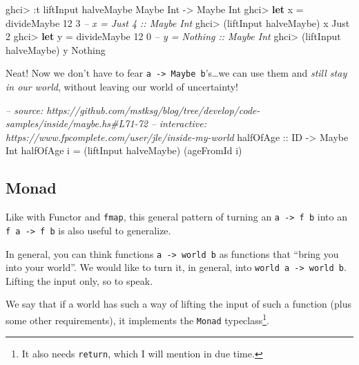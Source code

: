 \documentclass[]{article}
\newenvironment{Shaded}{}{}
\newcommand{\KeywordTok}[1]{\textcolor[rgb]{0.00,0.44,0.13}{\textbf{{#1}}}}
\newcommand{\DataTypeTok}[1]{\textcolor[rgb]{0.56,0.13,0.00}{{#1}}}
\newcommand{\DecValTok}[1]{\textcolor[rgb]{0.25,0.63,0.44}{{#1}}}
\newcommand{\CommentTok}[1]{\textcolor[rgb]{0.38,0.63,0.69}{\textit{{#1}}}}
\newcommand{\OtherTok}[1]{\textcolor[rgb]{0.00,0.44,0.13}{{#1}}}
\newcommand{\FunctionTok}[1]{\textcolor[rgb]{0.02,0.16,0.49}{{#1}}}
\newcommand{\NormalTok}[1]{{#1}}
\begin{document}
\begin{Shaded}
\begin{Highlighting}[]
\NormalTok{ghci}\FunctionTok{>} \FunctionTok{:}\NormalTok{t liftInput halveMaybe}
\DataTypeTok{Maybe} \DataTypeTok{Int} \OtherTok{->} \DataTypeTok{Maybe} \DataTypeTok{Int}
\NormalTok{ghci}\FunctionTok{>} \KeywordTok{let} \NormalTok{x }\FunctionTok{=} \NormalTok{divideMaybe }\DecValTok{12} \DecValTok{3}     \CommentTok{-- x = Just 4 :: Maybe Int}
\NormalTok{ghci}\FunctionTok{>} \NormalTok{(liftInput halveMaybe) x}
\DataTypeTok{Just} \DecValTok{2}
\NormalTok{ghci}\FunctionTok{>} \KeywordTok{let} \NormalTok{y }\FunctionTok{=} \NormalTok{divideMaybe }\DecValTok{12} \DecValTok{0}     \CommentTok{-- y = Nothing :: Maybe Int}
\NormalTok{ghci}\FunctionTok{>} \NormalTok{(liftInput halveMaybe) y}
\DataTypeTok{Nothing}
\end{Highlighting}
\end{Shaded}

Neat! Now we don't have to fear \texttt{a\ -\textgreater{}\ Maybe\ b}'s\ldots{}we can use them and
\emph{still stay in our world}, without leaving our world of uncertainty!

\begin{Shaded}
\begin{Highlighting}[]
\CommentTok{-- source: https://github.com/mstksg/blog/tree/develop/code-samples/inside/maybe.hs#L71-72}
\CommentTok{-- interactive: https://www.fpcomplete.com/user/jle/inside-my-world}
\OtherTok{halfOfAge ::} \DataTypeTok{ID} \OtherTok{->} \DataTypeTok{Maybe} \DataTypeTok{Int}
\NormalTok{halfOfAge i }\FunctionTok{=} \NormalTok{(liftInput halveMaybe) (ageFromId i)}
\end{Highlighting}
\end{Shaded}

\subsection{Monad}\label{monad}

Like with Functor and \texttt{fmap}, this general pattern of turning an
\texttt{a\ -\textgreater{}\ f\ b} into an \texttt{f\ a\ -\textgreater{}\ f\ b} is also useful to
generalize.

In general, you can think functions \texttt{a\ -\textgreater{}\ world\ b} as functions that ``bring
you into your world''. We would like to turn it, in general, into
\texttt{world\ a\ -\textgreater{}\ world\ b}. Lifting the input only, so to speak.

We say that if a world has such a way of lifting the input of such a function (plus some other
requirements), it implements the \texttt{Monad} typeclass\footnote{It also needs \texttt{return},
  which I will mention in due time.}.
\end{document}
